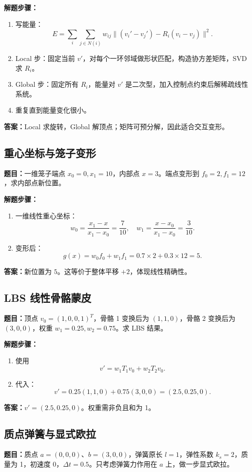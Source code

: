 \documentclass[UTF8,zihao=-4,scheme=chinese,fontset=fandol]{ctexart}
\begin{document}
\textbf{解题步骤：}
\begin{enumerate}
  \item 写能量：
  \[
  E=\sum_i\sum_{j\in N(i)}w_{ij}\|(v_i'-v_j')-R_i(v_i-v_j)\|^2.
  \]
  \item Local 步：固定当前 $v'$，对每个一环邻域做形状匹配，构造协方差矩阵，SVD 求 $R_i$。
  \item Global 步：固定所有 $R_i$，能量对 $v'$ 是二次型，加入控制点约束后解稀疏线性系统。
  \item 重复直到能量变化很小。
\end{enumerate}
\textbf{答案：}Local 求旋转，Global 解顶点；矩阵可预分解，因此适合交互变形。

\subsection{重心坐标与笼子变形}
\textbf{题目：}一维笼子端点 $x_0=0,x_1=10$，内部点 $x=3$。端点变形到 $f_0=2,f_1=12$，求内部点新位置。

\textbf{解题步骤：}
\begin{enumerate}
  \item 一维线性重心坐标：
  \[
  w_0=\frac{x_1-x}{x_1-x_0}=\frac7{10},\quad
  w_1=\frac{x-x_0}{x_1-x_0}=\frac3{10}.
  \]
  \item 变形后：
  \[
  g(x)=w_0f_0+w_1f_1=0.7\times2+0.3\times12=5.
  \]
\end{enumerate}
\textbf{答案：}新位置为 $5$。这等价于整体平移 $+2$，体现线性精确性。

\subsection{LBS 线性骨骼蒙皮}
\textbf{题目：}顶点 $v_0=(1,0,0,1)^T$，骨骼 1 变换后为 $(1,1,0)$，骨骼 2 变换后为 $(3,0,0)$，权重 $w_1=0.25,w_2=0.75$。求 LBS 结果。

\textbf{解题步骤：}
\begin{enumerate}
  \item 使用
  \[
  v'=w_1T_1v_0+w_2T_2v_0.
  \]
  \item 代入：
  \[
  v'=0.25(1,1,0)+0.75(3,0,0)=(2.5,0.25,0).
  \]
\end{enumerate}
\textbf{答案：}$v'=(2.5,0.25,0)$。权重需非负且和为 1。

\subsection{质点弹簧与显式欧拉}
\textbf{题目：}质点 $a=(0,0,0)$、$b=(3,0,0)$，弹簧原长 $l=1$，弹性系数 $k_s=2$，质量为 1，初速度 0，$\Delta t=0.5$。只考虑弹簧力作用在 $a$ 上，做一步显式欧拉。
\end{document}
